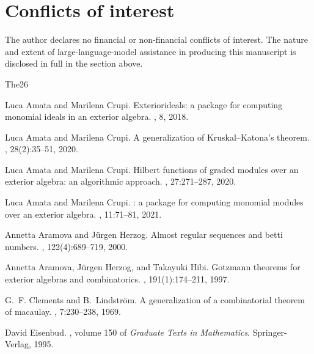 \documentclass[11pt, a4paper, abstract=yes]{scrartcl}
\theoremstyle{definition}
\theoremstyle{remark}
\theoremstyle{plain}
\begin{document}
\section*{Conflicts of interest}
\label{sec:orgd8cd07a}
The author declares no financial or non-financial conflicts of interest. The nature and extent of
large-language-model assistance in producing this manuscript is disclosed in full in the section
above.
\begin{thebibliography}{{The}26}

Luca Amata and Marilena Crupi.
\newblock Exteriorideals: a package for computing monomial ideals in an
  exterior algebra.
, 8, 2018.

Luca Amata and Marilena Crupi.
\newblock A generalization of {K}ruskal--{K}atona's theorem.
, 28(2):35--51, 2020.

Luca Amata and Marilena Crupi.
\newblock Hilbert functions of graded modules over an exterior algebra: an
  algorithmic approach.
, 27:271--287, 2020.

Luca Amata and Marilena Crupi.
: a package for computing monomial modules over an
  exterior algebra.
, 11:71--81, 2021.

Annetta Aramova and J{\"u}rgen Herzog.
\newblock Almost regular sequences and betti numbers.
, 122(4):689--719, 2000.

Annetta Aramova, J{\"u}rgen Herzog, and Takayuki Hibi.
\newblock Gotzmann theorems for exterior algebras and combinatorics.
, 191(1):174--211, 1997.

G.~F. Clements and B.~Lindstr{\"o}m.
\newblock A generalization of a combinatorial theorem of macaulay.
, 7:230--238, 1969.

David Eisenbud.
,
  volume 150 of {\em Graduate Texts in Mathematics}.
\newblock Springer-Verlag, 1995.


\end{thebibliography}
\end{document}
